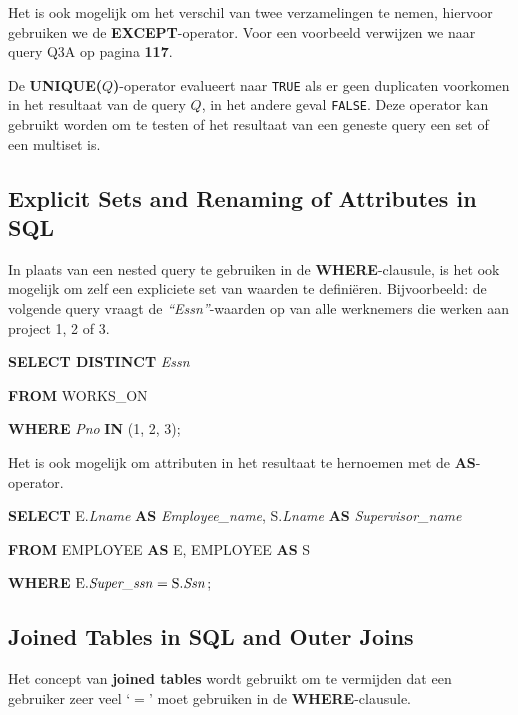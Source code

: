 \noindent Het is ook mogelijk om het verschil van twee verzamelingen te nemen, hiervoor gebruiken we de \textbf{EXCEPT}-operator. Voor een voorbeeld verwijzen we naar query Q3A op pagina \textbf{117}.

De \textbf{UNIQUE($Q$)}-operator evalueert naar \texttt{TRUE} als er geen duplicaten voorkomen in het resultaat van de query $Q$, in het andere geval \texttt{FALSE}. Deze operator kan gebruikt worden om te testen of het resultaat van een geneste query een set of een multiset is.


\subsection{Explicit Sets and Renaming of Attributes in SQL}
In plaats van een nested query te gebruiken in de \textbf{WHERE}-clausule, is het ook mogelijk om zelf een expliciete set van waarden te defini\"eren. Bijvoorbeeld: de volgende query vraagt de \textit{``Essn''}-waarden op van alle werknemers die werken aan project 1, 2 of 3.

\vspace{1mm}\hspace{10mm}
\textbf{SELECT DISTINCT} \textit{Essn}

\hspace{10mm}
\textbf{FROM} WORKS\_ON

\hspace{10mm}
\textbf{WHERE} \textit{Pno} \textbf{IN} (1, 2, 3);
\vspace{3mm}

\noindent Het is ook mogelijk om attributen in het resultaat te hernoemen met de \textbf{AS}-operator.

\vspace{1mm}\hspace{10mm}
\textbf{SELECT} E.\textit{Lname} \textbf{AS} \textit{Employee\_name}, S.\textit{Lname} \textbf{AS} \textit{Supervisor\_name}

\hspace{10mm}
\textbf{FROM} EMPLOYEE \textbf{AS} E, EMPLOYEE \textbf{AS} S

\hspace{10mm}
\textbf{WHERE} $\text{E.\textit{Super\_ssn}} = \text{S.\textit{Ssn}}$;


\subsection{Joined Tables in SQL and Outer Joins}
Het concept van \textbf{joined tables} wordt gebruikt om te vermijden dat een gebruiker zeer veel `$=$' moet gebruiken in de \textbf{WHERE}-clausule.

